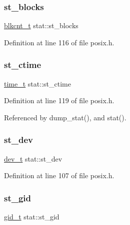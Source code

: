 \subsubsection{\texorpdfstring{st\+\_\+blocks}{st\_blocks}}
{\footnotesize\ttfamily \hyperlink{posix_8h_a2706f994576080967d7633282dfcabbf}{blkcnt\+\_\+t} stat\+::st\+\_\+blocks}



Definition at line 116 of file posix.\+h.

\mbox{\label{structstat_a1b4b858db1ebe79c3d6e0fc1ef721024}} 
\subsubsection{\texorpdfstring{st\+\_\+ctime}{st\_ctime}}
{\footnotesize\ttfamily \hyperlink{time_8h_a3346b04b0420b32ccf6b706551b70762}{time\+\_\+t} stat\+::st\+\_\+ctime}



Definition at line 119 of file posix.\+h.



Referenced by dump\+\_\+stat(), and stat().

\mbox{\label{structstat_ac5b90090ae323741ae4c9e4f3683a29f}} 
\subsubsection{\texorpdfstring{st\+\_\+dev}{st\_dev}}
{\footnotesize\ttfamily \hyperlink{posix_8h_a451f1b5788fa7cc5d33db47a5992e7a6}{dev\+\_\+t} stat\+::st\+\_\+dev}



Definition at line 107 of file posix.\+h.

\mbox{\label{structstat_ab864f16f436cec370f0ced585d897698}} 
\subsubsection{\texorpdfstring{st\+\_\+gid}{st\_gid}}
{\footnotesize\ttfamily \hyperlink{posix_8h_a5569b17fdf47f9bb7e3b4b94aa083c39}{gid\+\_\+t} stat\+::st\+\_\+gid}



